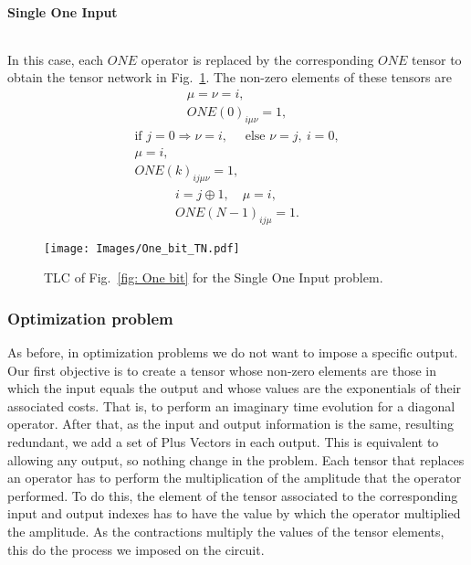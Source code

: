 \paragraph{Single One Input}
$ $

In this case, each $ONE$ operator is replaced by the corresponding $ONE$ tensor to obtain the tensor network in Fig.~\ref{fig: One bit TN}. The non-zero elements of these tensors are
\begin{equation}
\begin{gathered}
    \mu = \nu =i,\\
    ONE(0)_{i\mu\nu}=1,
\end{gathered}
\end{equation}
\begin{equation}
\begin{gathered}
    \text{if } j=0\Rightarrow \nu = i,\quad\text{ else } \nu=j,\ i=0,\\
    \mu =i,\\
    ONE(k)_{ij\mu\nu}=1,
\end{gathered}
\end{equation}
\begin{equation}
\begin{gathered}
    i = j\oplus 1,\quad\mu =i,\\
    ONE(N-1)_{ij\mu}=1.
\end{gathered}
\end{equation}


\begin{figure}
    \centering
    \texttt{[image: Images/One\_bit\_TN.pdf]}
    \caption{TLC of Fig.~\ref{fig: One bit} for the Single One Input problem.}
    \label{fig: One bit TN}
\end{figure}




\subsubsection{Optimization problem}
As before, in optimization problems we do not want to impose a specific output. Our first objective is to create a tensor whose non-zero elements are those in which the input equals the output and whose values are the exponentials of their associated costs. That is, to perform an imaginary time evolution for a diagonal operator. After that, as the input and output information is the same, resulting redundant, we add a set of Plus Vectors in each output. This is equivalent to allowing any output, so nothing change in the problem. Each tensor that replaces an operator has to perform the multiplication of the amplitude that the operator performed. To do this, the element of the tensor associated to the corresponding input and output indexes has to have the value by which the operator multiplied the amplitude. As the contractions multiply the values of the tensor elements, this do the process we imposed on the circuit.

